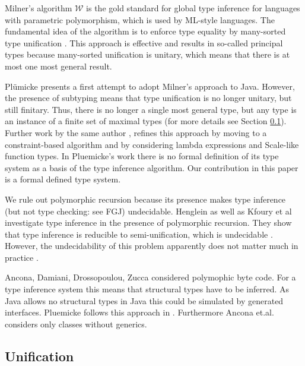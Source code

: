 Milner's algorithm $\mathcal{W}$ \cite{DBLP:journals/jcss/Milner78} is
the gold standard for global type inference for languages with 
parametric polymorphism, which is used by ML-style languages. The fundamental idea
of the algorithm is to enforce type equality by many-sorted type
unification \cite{Rob65,MM82}. This approach is effective and results
in so-called principal types because many-sorted unification is
unitary, which means that there is at most one most general result.

Pl\"umicke \cite{Plue07_3} presents a first attempt to adopt Milner's
approach to Java. However, the presence of subtyping means that type
unification is no longer unitary, but still finitary. Thus, there is
no longer a single most general type, but any type is an instance of a
finite set of maximal types (for more details see Section
\ref{sec:unification}). Further work by the same author
\cite{plue15_2,plue17_2}, 
refines this approach by moving to a constraint-based algorithm and by
considering lambda expressions and Scale-like function types.
In Pluemicke's work there is no formal definition of its type system as a basis
of the type inference algorithm. Our contribution in this paper is a formal defined
type system. 

We rule out polymorphic recursion because its presence makes type
inference (but not type checking: see FGJ) undecidable. Henglein
\cite{DBLP:journals/toplas/Henglein93} as well as Kfoury et al
\cite{DBLP:journals/toplas/KfouryTU93} investigate type inference in
the presence of polymorphic recursion. They show that type inference
is reducible to semi-unification, which is undecidable
\cite{DBLP:journals/iandc/KfouryTU93}. However, the undecidability of
this problem apparently does not matter much in practice
\cite{DBLP:journals/tcs/EmmsL99}. 

Ancona, Damiani, Drossopoulou, Zucca \cite{ADDZ05} considered polymophic byte
code. For a type inference system this means that structural types have to be
inferred. As \textsf{Java} allows no structural types in \textsf{Java} this could be simulated by
generated interfaces. Pluemicke follows this approach in
\cite{plue16_1}. Furthermore Ancona et.al. considers only classes without
generics. 



\subsection{Unification}
\label{sec:unification}

